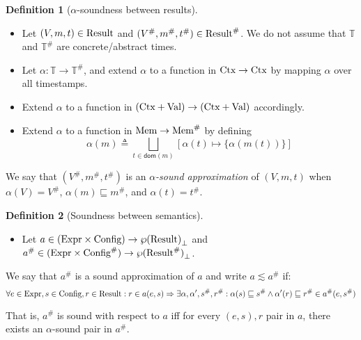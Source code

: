 \documentclass{article}
\theoremstyle{definition}
\newtheorem{definition}{Definition}[section]
\newcommand*{\A}[1]{{#1}^{\#}}
\newcommand*{\Expr}{\text{Expr}}
\newcommand*{\Time}{\mathbb{T}}
\newcommand*{\ATime}{\A{\Time}}
\newcommand*{\Ctx}[1]{\text{Ctx}\vphantom{#1}}
\newcommand*{\Value}[1]{\text{Val}\vphantom{#1}}
\newcommand*{\Mem}[1]{\text{Mem}\vphantom{#1}}
\newcommand*{\mem}{m}
\newcommand*{\AMem}[1]{\A{\text{Mem}}\vphantom{#1}}
\newcommand*{\Config}[1]{\text{Config}\vphantom{#1}}
\newcommand*{\AConfig}[1]{\A{\text{Config}}\vphantom{#1}}
\newcommand*{\Result}[1]{\text{Result}\vphantom{#1}}
\newcommand*{\AResult}[1]{\A{\text{Result}}\vphantom{#1}}
\begin{document}
\begin{definition}[$\alpha$-soundness between results]
  $\:$

  \begin{itemize}
    \item Let $(V,\mem,t)\in\Result{\Time}$ and $(\A{V},\A\mem,\A{t})\in\AResult{\ATime}$. We do not assume that $\Time$ and $\ATime$ are concrete/abstract times.
    \item Let $\alpha:\Time\rightarrow\ATime$, and extend $\alpha$ to a function in $\Ctx{\Time}\rightarrow\Ctx{\ATime}$ by mapping $\alpha$ over all timestamps.
    \item Extend $\alpha$ to a function in $(\Ctx{\Time}+\Value{\Time})\rightarrow(\Ctx{\ATime}+\Value{\ATime})$ accordingly.
    \item Extend $\alpha$ to a function in $\Mem{\Time}\rightarrow\AMem{\ATime}$ by defining
          \[\alpha(\mem)\triangleq\bigsqcup_{t\in\mathsf{dom}(\mem)}[\alpha(t)\mapsto\{\alpha(\mem(t))\}]\]
  \end{itemize}

  We say that $(\A{V},\A\mem,\A{t})$ is an \emph{$\alpha$-sound approximation} of $(V,\mem,t)$ when $\alpha(V)=\A{V}$, $\alpha(\mem)\sqsubseteq\A\mem$, and $\alpha(t)=\A{t}$.
\end{definition}

\begin{definition}[Soundness between semantics]
  $\:$

  \begin{itemize}
    \item Let $a\in(\Expr\times\Config{\Time})\rightarrow{\wp(\Result{\Time})}_{\bot}$ and $\A{a}\in(\Expr\times\AConfig{\ATime})\rightarrow{\wp(\AResult{\ATime})}_{\bot}$.
  \end{itemize}

  We say that $\A{a}$ is a sound approximation of $a$ and write $a\lesssim\A{a}$ if:
  \[
    \forall e\in\Expr,s\in\Config{\Time},r\in\Result{\Time}:r\in a(e,s)\Rightarrow\exists\alpha,\alpha',\A{s},\A{r}:\alpha(s)\sqsubseteq\A{s}\wedge\alpha'(r)\sqsubseteq\A{r}\in\A{a}(e,\A{s})
  \]

  That is, $\A{a}$ is sound with respect to $a$ iff for every $(e,s), r$ pair in $a$, there exists an $\alpha$-sound pair in $\A{a}$.
\end{definition}
\end{document}
